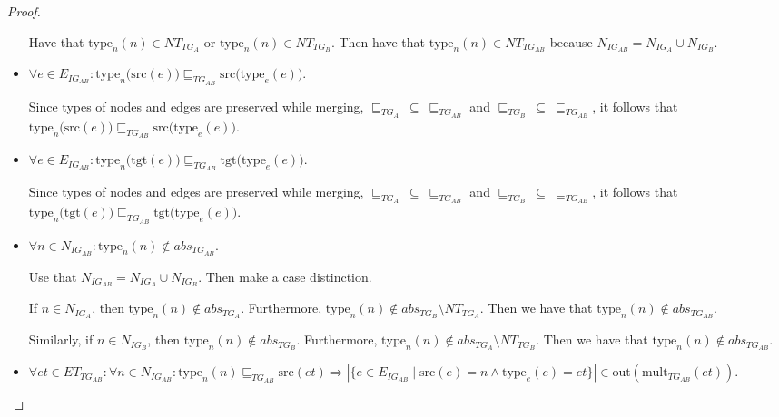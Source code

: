 \begin{proof}
\begin{itemize}
    Have that $\mathrm{type}_n(n) \in NT_{TG_{A}}$ or $\mathrm{type}_n(n) \in NT_{TG_{B}}$. Then have that $\mathrm{type}_n(n) \in NT_{TG_{AB}}$ because $N_{IG_{AB}} = N_{IG_{A}} \cup N_{IG_{B}}$.
    
    
    \item $\forall e \in E_{IG_{AB}}\!: \mathrm{type}_n \big(\mathrm{src}(e)\big) \sqsubseteq_{TG_{AB}} \mathrm{src} \big(\mathrm{type}_e(e)\big)$.
    
    Since types of nodes and edges are preserved while merging, $\sqsubseteq_{TG_{A}}\ \subseteq\ \sqsubseteq_{TG_{AB}}$ and $\sqsubseteq_{TG_{B}}\ \subseteq\ \sqsubseteq_{TG_{AB}}$, it follows that $\mathrm{type}_n \big(\mathrm{src}(e)\big) \sqsubseteq_{TG_{AB}} \mathrm{src} \big(\mathrm{type}_e(e)\big)$.
    
    
    \item $\forall e \in E_{IG_{AB}}\!: \mathrm{type}_n \big(\mathrm{tgt}(e)\big) \sqsubseteq_{TG_{AB}} \mathrm{tgt} \big(\mathrm{type}_e(e)\big)$.
    
    Since types of nodes and edges are preserved while merging, $\sqsubseteq_{TG_{A}}\ \subseteq\ \sqsubseteq_{TG_{AB}}$ and $\sqsubseteq_{TG_{B}}\ \subseteq\ \sqsubseteq_{TG_{AB}}$, it follows that $\mathrm{type}_n \big(\mathrm{tgt}(e)\big) \sqsubseteq_{TG_{AB}} \mathrm{tgt} \big(\mathrm{type}_e(e)\big)$.
    
    
    \item $\forall n \in N_{IG_{AB}}\!: \mathrm{type}_n(n) \not\in abs_{TG_{AB}}$.
    
    Use that $N_{IG_{AB}} = N_{IG_{A}} \cup N_{IG_{B}}$. Then make a case distinction.
    
    If $n \in N_{IG_{A}}$, then $\mathrm{type}_n(n) \not\in abs_{TG_{A}}$. Furthermore, $\mathrm{type}_n(n) \not\in abs_{TG_{B}} \setminus NT_{TG_{A}}$. Then we have that $\mathrm{type}_n(n) \not\in abs_{TG_{AB}}$.
    
    Similarly, if $n \in N_{IG_{B}}$, then $\mathrm{type}_n(n) \not\in abs_{TG_{B}}$. Furthermore, $\mathrm{type}_n(n) \not\in abs_{TG_{A}} \setminus NT_{TG_{B}}$. Then we have that $\mathrm{type}_n(n) \not\in abs_{TG_{AB}}$.
    
    
    \item $\forall et \in ET_{TG_{AB}}\!: \forall n \in N_{IG_{AB}}\!: \mathrm{type}_n(n) \sqsubseteq_{TG_{AB}} \mathrm{src}(et) \Longrightarrow |\{e \in E_{IG_{AB}} \mid \mathrm{src}(e) = n \land \mathrm{type}_e(e) = et\}| \in \mathrm{out}(\mathrm{mult}_{TG_{AB}}(et))$.
    

\end{itemize}
\end{proof}
